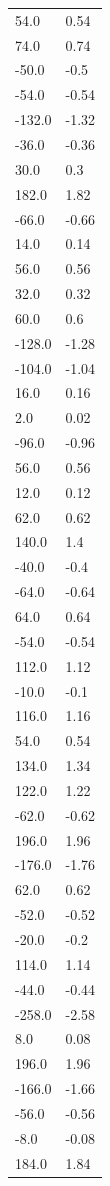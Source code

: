 \begin{longtable}{ll}
54.0 & 0.54 \\
74.0 & 0.74 \\
-50.0 & -0.5 \\
-54.0 & -0.54 \\
-132.0 & -1.32 \\
-36.0 & -0.36 \\
30.0 & 0.3 \\
182.0 & 1.82 \\
-66.0 & -0.66 \\
14.0 & 0.14 \\
56.0 & 0.56 \\
32.0 & 0.32 \\
60.0 & 0.6 \\
-128.0 & -1.28 \\
-104.0 & -1.04 \\
16.0 & 0.16 \\
2.0 & 0.02 \\
-96.0 & -0.96 \\
56.0 & 0.56 \\
12.0 & 0.12 \\
62.0 & 0.62 \\
140.0 & 1.4 \\
-40.0 & -0.4 \\
-64.0 & -0.64 \\
64.0 & 0.64 \\
-54.0 & -0.54 \\
112.0 & 1.12 \\
-10.0 & -0.1 \\
116.0 & 1.16 \\
54.0 & 0.54 \\
134.0 & 1.34 \\
122.0 & 1.22 \\
-62.0 & -0.62 \\
196.0 & 1.96 \\
-176.0 & -1.76 \\
62.0 & 0.62 \\
-52.0 & -0.52 \\
-20.0 & -0.2 \\
114.0 & 1.14 \\
-44.0 & -0.44 \\
-258.0 & -2.58 \\
8.0 & 0.08 \\
196.0 & 1.96 \\
-166.0 & -1.66 \\
-56.0 & -0.56 \\
-8.0 & -0.08 \\
184.0 & 1.84 \\

\end{longtable}
